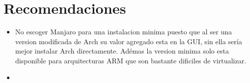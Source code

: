 \documentclass{article}
\begin{document}
\section{Recomendaciones}
\begin{itemize}
    \item No escoger Manjaro para una instalacion minima puesto que al ser una version modificada de Arch su valor agregado esta en la GUI, sin ella sería mejor instalar Arch directamente. Adémas la version minima solo esta disponible para arquitecturas ARM que son bastante dificiles de virtualizar.
    \item 
\end{itemize}
\end{document}
